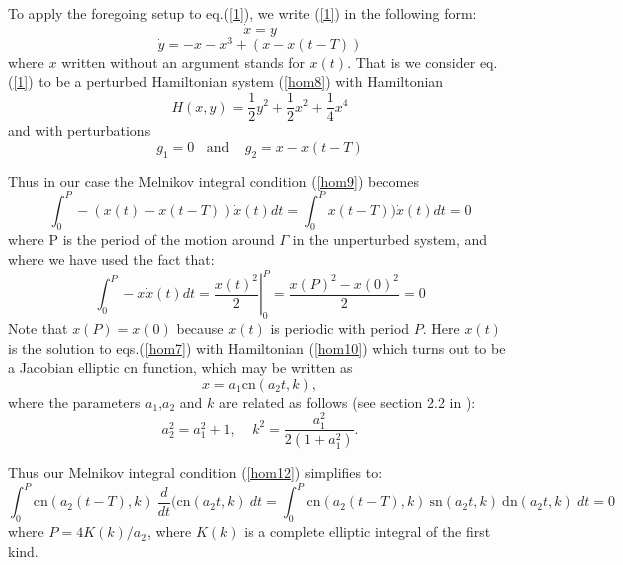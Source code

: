 \documentclass[12pt]{article}
\begin{document}
To apply the foregoing setup to eq.(\ref{1}), we write (\ref{1}) in the following form:
\begin{equation}\label{qq} \dot x=y \end{equation}
\begin{equation}\label{qq} \dot y=-x-x^3+(x-x(t-T)) \end{equation}
where $x$ written without an argument stands for $x(t)$.  That is we consider eq.(\ref{1}) to be a perturbed Hamiltonian system (\ref{hom8}) with
Hamiltonian
\begin{equation}
H(x,y)=\frac{1}{2}y^2+\frac{1}{2}x^2 +\frac{1}{4}x^4
\label{hom10}
\end{equation}
and with perturbations
\begin{equation}
 g_1=0 ~~~~\mbox{and}~~~~~ g_2=x-x(t-T)
\label{hom11}
\end{equation}

Thus in our case the Melnikov integral condition (\ref{hom9}) becomes
\begin{equation}
\int_0^P -(x(t)-x(t-T))\dot x(t) dt=\int_0^P x(t-T))\dot x(t) dt = 0
\label{hom12}
\end{equation}
where P is the period of the motion around $\Gamma$ in the unperturbed system, and where we have used the fact that:
 $$\int_0^P -x\dot x(t) dt=\left.\frac{x(t)^2}{2}\right|_0^P=\frac{x(P)^2-x(0)^2}{2}=0$$  
 Note that $x(P)=x(0)$ because $x(t)$ is periodic with period $P$.
Here $x(t)$ is the solution to eqs.(\ref{hom7}) with Hamiltonian (\ref{hom10})
 which turns out to be a Jacobian elliptic cn function, which may be written as  
 \begin{equation}
x=a_1\text{cn}(a_2t,k),
 \label{hom13}
 \end{equation}
 where the
 parameters $a_1$,$a_2$ and $k$ are related as follows (see section 2.2 in \cite{rhr}):
\begin{equation}
a_2^2=a_1^2+1,~~~~~ k^2=\frac{a_1^2}{2(1+a_1^2)}.
\label{hom14}
\end{equation}

Thus our Melnikov integral condition (\ref{hom12}) simplifies to:
\begin{equation}
\label{qqI} 
\int_0^P \text{cn}(a_2(t-T),k)~\frac{d}{dt}(\text{cn}(a_2t,k)~ dt=\int_0^P \text{cn}(a_2(t-T),k)~\text{sn}(a_2t,k)~\text{dn}(a_2t,k)~dt = 0
\end{equation}
where $P=4K(k)/a_2$, where $K(k)$ is a complete elliptic integral of the first kind.\\
\end{document}
